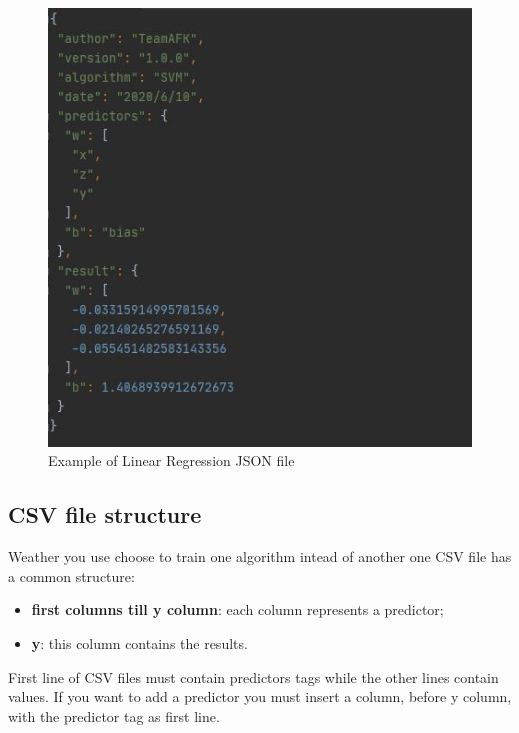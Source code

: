 		\begin{figure}[H]
		\centering
		\includegraphics[scale=0.70]{../Developer_manual/img/support_vector_machine_json.jpg}
		\caption{Example of Linear Regression JSON file}
	\end{figure}	
		
	
	\subsection{CSV file structure}
Weather you use choose to train one algorithm intead of another one CSV file has a common structure:
	\begin{itemize}
		\item\textbf{first columns till y column}: each column represents a predictor;
		\item\textbf{y}: this column contains the results.	
	\end{itemize}	 

First line of CSV files must contain predictors tags while the other lines contain values. If you want to add a predictor you must insert a column, before y column, with the predictor tag as first line.

